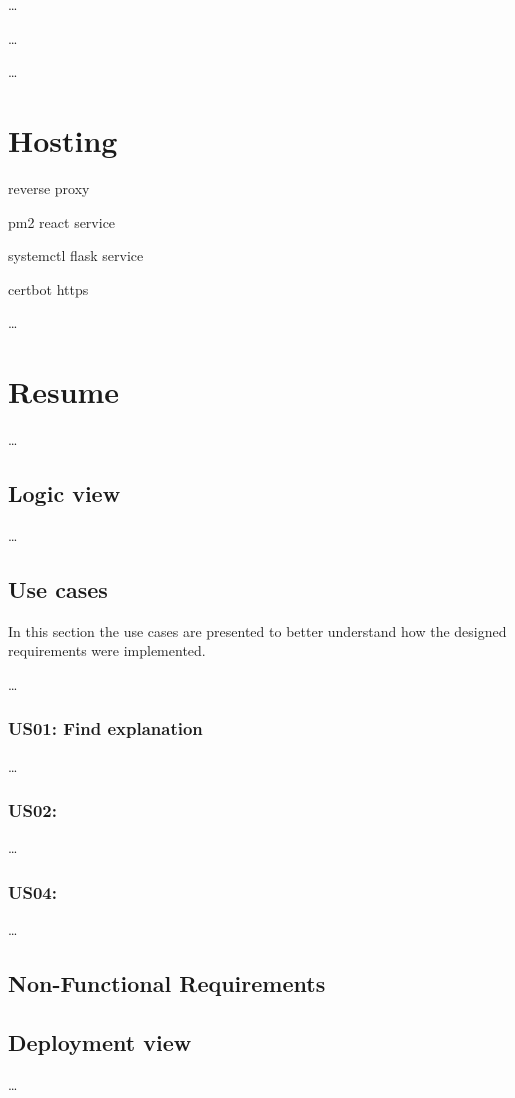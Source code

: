 \dots %

\dots %

\dots %

\section{Hosting}

reverse proxy

pm2 react service

systemctl flask service

certbot https

\dots %

\section{Resume}

\dots %

\subsection{Logic view}

\dots

\subsection{Use cases}

In this section the use cases are presented to better understand how the designed requirements were implemented.

\dots %

\subsubsection{US01: Find explanation}

\dots %

\subsubsection{US02: }

\dots %

\subsubsection{US04: }

\dots %

\subsection{Non-Functional Requirements}

\subsection{Deployment view}

\dots %
